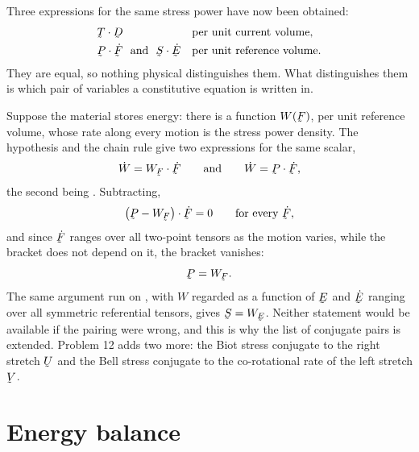 
\begin{remark}\label{rem:ch6conjugate}
Three expressions for the same stress power have now been obtained:
\[
\begin{aligned}
   &\bT\cdot\bD &&\text{per unit current volume},\\
   &\bP\cdot\dot\bF\ \text{ and }\ \bS\cdot\dot\bE
   &&\text{per unit reference volume}.
\end{aligned}
\]
They are equal, so nothing physical distinguishes them. What
distinguishes them is which pair of variables a constitutive equation
is written in.

Suppose the material stores energy: there is a function $W(\bF)$, per
unit reference volume, whose rate along every motion is the stress
power density. The hypothesis and the chain rule give two expressions
for the same scalar,
\[
   \dot W=W_{\bF}\cdot\dot\bF
   \qquad\text{and}\qquad
   \dot W=\bP\cdot\dot\bF ,
\]
the second being . Subtracting,
\[
   \big(\bP-W_{\bF}\big)\cdot\dot\bF=0
   \qquad\text{for every }\dot\bF ,
\]
and since $\dot\bF$ ranges over all two-point tensors as the motion
varies, while the bracket does not depend on it, the bracket vanishes:
\[
   \bP=W_{\bF} .
\]
The same argument run on , with $W$ regarded as a function
of $\bE$ and $\dot\bE$ ranging over all symmetric referential tensors,
gives $\bS=W_{\bE}$. Neither statement would be available if the pairing were wrong,
and this is why the list of conjugate pairs is extended. Problem
12 adds two more: the Biot stress conjugate to the right stretch $\bU$
and the Bell stress conjugate to the co-rotational rate of the left
stretch $\bV$.
\end{remark}



\section{Energy balance}\label{sec:ch6energy}

